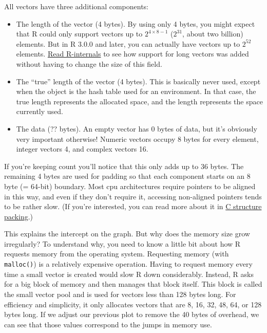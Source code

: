 All vectors have three additional components: 

\begin{itemize}
\item
  The length of the vector (4 bytes). By using only 4 bytes, you might
  expect that R could only support vectors up to $2 ^ {4 \times 8 - 1}$
  ($2 ^ {31}$, about two billion) elements. But in R 3.0.0 and later,
  you can actually have vectors up to $2 ^ {52}$ elements.
  \href{http://cran.r-project.org/doc/manuals/R-ints.html\#Long-vectors}{Read
  R-internals} to see how support for long vectors was added without
  having to change the size of this field. 
\item
  The ``true'' length of the vector (4 bytes). This is basically never
  used, except when the object is the hash table used for an
  environment. In that case, the true length represents the allocated
  space, and the length represents the space currently used.
\item
  The data (?? bytes). An empty vector has 0 bytes of data, but it's
  obviously very important otherwise! Numeric vectors occupy 8 bytes for
  every element, integer vectors 4, and complex vectors 16.
\end{itemize}

If you're keeping count you'll notice that this only adds up to 36
bytes. The remaining 4 bytes are used for padding so that each component
starts on an 8 byte (= 64-bit) boundary. Most cpu architectures require
pointers to be aligned in this way, and even if they don't require it,
accessing non-aligned pointers tends to be rather slow. (If you're
interested, you can read more about it in
\href{http://www.catb.org/esr/structure-packing/}{C structure packing}.)

This explains the intercept on the graph. But why does the memory size
grow irregularly? To understand why, you need to know a little bit about
how R requests memory from the operating system. Requesting memory (with
\texttt{malloc()}) is a relatively expensive operation. Having to
request memory every time a small vector is created would slow R down
considerably. Instead, R asks for a big block of memory and then manages
that block itself. This block is called the small vector pool and is
used for vectors less than 128 bytes long. For efficiency and
simplicity, it only allocates vectors that are 8, 16, 32, 48, 64, or 128
bytes long. If we adjust our previous plot to remove the 40 bytes of
overhead, we can see that those values correspond to the jumps in memory
use.

